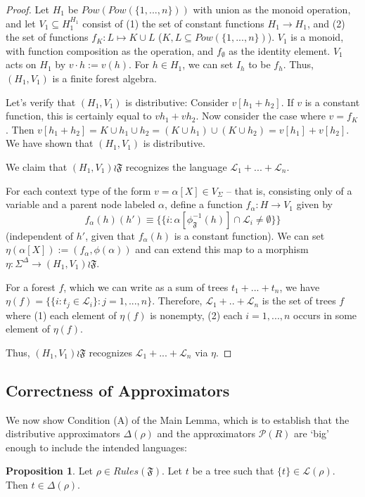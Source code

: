 \documentclass[sigplan,9pt]{acmart}\settopmatter{printfolios=true,printccs=false,printacmref=false}
\newcounter{thm}
\newcounter{theorem}
\theoremstyle{definition}
\newtheorem{prop}[thm]{Proposition}
\newcommand{\La}[0]{{\mathcal{L}}}
\newcommand{\Ff}[0]{{\mathfrak{F}}}
\newcommand{\Pa}[0]{{\mathcal{P}}}
\begin{document}
\begin{proof}
Let $H_1$ be $Pow(Pow(\{1,...,n\}))$ with union as the monoid operation, and let $V_1 \subseteq H_1^{H_1}$ consist of (1) the set of constant functions $H_1 \rightarrow H_1$, and (2) the set of functions $f_K : L \mapsto K \cup L$ ($K, L \subseteq Pow(\{1,...,n\})$).
$V_1$ is a monoid, with function composition as the operation, and $f_\emptyset$ as the identity element.
$V_1$ acts on $H_1$ by $v\cdot h := v(h)$.
For $h \in H_1$, we can set $I_h$ to be $f_h$.
Thus, $(H_1,V_1)$ is a finite forest algebra.

Let's verify that $(H_1, V_1)$ is distributive:
Consider $v[h_1+h_2]$. If $v$ is a constant function, this is certainly equal to $vh_1+vh_2$.
Now consider the case where $v = f_K$. Then
$v[h_1+h_2] = K\cup h_1 \cup h_2 = (K\cup h_1) \cup (K \cup h_2) = v[h_1] + v[h_2]$.
We have shown that $(H_1, V_1)$ is distributive.


We claim that $(H_1, V_1) \wr \Ff$ recognizes the language $\La_1 + ... + \La_n$.

For each context type of the form $v = \alpha[X] \in V_\Sigma$ -- that is, consisting only of a variable and a parent node labeled $\alpha$, define a function
$f_\alpha : H \rightarrow V_1$ given by 
$$f_\alpha(h)(h') \equiv \{\{i : \alpha[\phi_\Ff^{-1}(h)] \cap \La_i \neq \emptyset\}\}$$
(independent of $h'$, given that $f_\alpha(h)$ is a constant function).
We can set $\eta(\alpha[X]) := (f_\alpha, \phi(\alpha))$ and can extend this map to a morphism $\eta : \Sigma^\Delta \rightarrow (H_1, V_1) \wr \Ff$.

For a forest $f$, which we can write as a sum of trees $t_1 + ... + t_n$, we have
$\eta(f) = \{\{i : t_j \in \La_i\} : j = 1, ..., n\}$.
Therefore, $\La_1 + .. + \La_n$ is the set of trees $f$ where (1) each element of $\eta(f)$ is nonempty, (2) each $i = 1, ..., n$ occurs in some element of $\eta(f)$.

Thus, $(H_1, V_1) \wr \Ff$ recognizes $\La_1 + ... + \La_n$ via $\eta$.
\end{proof}

\subsection{Correctness of Approximators}
We now show Condition (A) of the Main Lemma, which is to establish that the distributive approximators $\Delta(\rho)$ and the  approximators $\Pa(R)$ are `big' enough to include the intended languages:

\begin{prop}
Let $\rho \in Rules(\Ff)$. Let $t$ be a tree such that $\{t\} \in \La(\rho)$. Then $t \in \Delta(\rho)$.
\end{prop}
\end{document}

